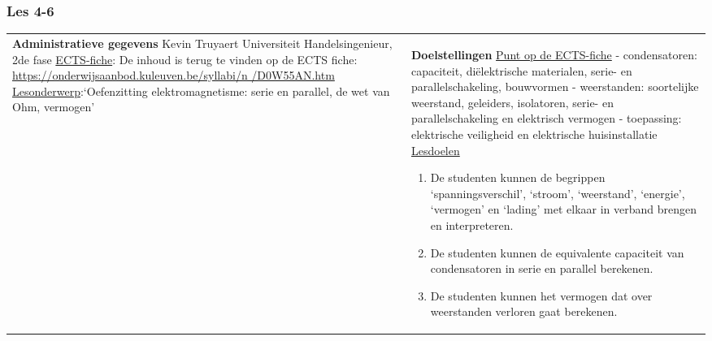 


\begin{landscape}
	
	\subsubsection{Les 4-6}
	\begin{tabularx}{1.56\textwidth}{|p{}|X|}\hline
		\textbf{Administratieve gegevens}\newline\newline
		Kevin Truyaert\newline\newline
		Universiteit\newline
		Handelsingenieur, 2de fase\newline
		\underline{ECTS-fiche}: De inhoud is terug te vinden op de ECTS fiche: \href{https://onderwijsaanbod.kuleuven.be/syllabi/n/D0W55AN.htm}{https://onderwijsaanbod.kuleuven.be/syllabi/n /D0W55AN.htm} \newline
		\underline{Lesonderwerp}:\newline `Oefenzitting elektromagnetisme: serie en parallel, de wet van Ohm, vermogen' & \textbf{Doelstellingen}\newline\vspace{0.5cm}
		\underline{Punt op de ECTS-fiche}
		\vspace{-0.5cm}\newline  - condensatoren: capaciteit, diëlektrische materialen, serie- en parallelschakeling, bouwvormen \newline
		- weerstanden: soortelijke weerstand, geleiders, isolatoren, serie- en parallelschakeling en elektrisch vermogen\newline
		- toepassing: elektrische veiligheid en elektrische huisinstallatie \newline
		\underline{Lesdoelen}\newline
		\vspace{-0.5cm}
		\begin{enumerate}[itemsep=0.08\baselineskip]
			\item De studenten kunnen de begrippen `spanningsverschil', `stroom', `weerstand', `energie', `vermogen' en `lading' met elkaar in verband brengen en interpreteren.
			\item De studenten kunnen de equivalente capaciteit van condensatoren in serie en parallel berekenen.
			\item De studenten kunnen het vermogen dat over weerstanden verloren gaat berekenen.

\end{enumerate}
\end{tabularx}
\end{landscape}
